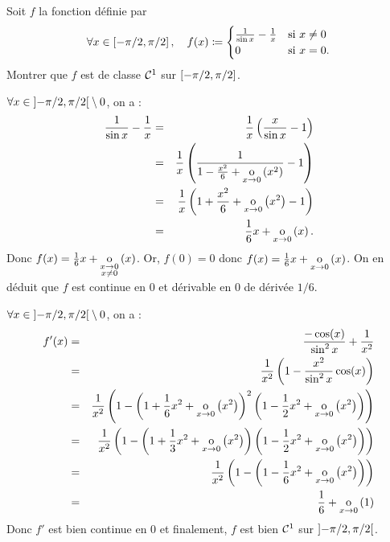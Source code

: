 \documentclass{magnolia}
\begin{document}
Soit $f$ la fonction définie par
\[\forall x\in\left[-\pi/2,\pi/2\right] ,\quad f(x)\coloneqq
  \begin{cases}
  \frac{1}{\sin x}-\frac{1}{x} & \text{si $x\neq 0$}\\
  0 & \text{si $x=0$.}
  \end{cases}\]
Montrer que $f$ est de classe $\mathcal{C}^{1}$ sur $\left[-\pi/2,\pi/2\right]$.

\begin{sol}
$\forall x \in \left]-\pi/2,\pi/2\right[\setminus{0}$, on a :
\begin{eqnarray*}
\frac{1}{\sin x}-\frac{1}{x}&=&\frac{1}{x}\left(\frac{x}{\sin x}-1\right)\\
&=&\frac{1}{x}\left(\frac{1}{1-\frac{x^2}{6}+\underset{x \rightarrow 0}{\text{o}}\left(x^2\right)}-1\right)\\
&=&\frac{1}{x}\left(1+\frac{x^2}{6}+\underset{x \rightarrow 0}{\text{o}}\left(x^2\right)-1\right)\\
&=&\frac{1}{6}x+\underset{x \rightarrow 0}{\text{o}}\left(x\right).
\end{eqnarray*}
Donc $f(x)=\frac{1}{6}x+\underset{\substack{x \rightarrow 0\\x\neq 0}}{\text{o}} \left(x\right)$. Or, $f(0)=0$ donc $f(x)=\frac{1}{6}x+\underset{x \rightarrow 0}{\text{o}}\left(x\right)$. On en déduit que $f$ est continue en $0$ et dérivable en $0$ de dérivée $1/6$.

$\forall x \in \left]-\pi/2,\pi/2\right[\setminus{0}$, on a :
\begin{eqnarray*}
f'(x)&=&\frac{-\cos(x)}{\sin^2 x}+\frac{1}{x^2}\\
&=&\frac{1}{x^2}\left(1-\frac{x^2}{\sin^2 x}\cos(x)\right)\\
&=&\frac{1}{x^2}\left(1-\left(1+\frac{1}{6}x^2+\underset{x \rightarrow 0}{\text{o}}\left(x^2\right)\right)^2\left(1-\frac{1}{2}x^2+\underset{x \rightarrow 0}{\text{o}}\left(x^2\right)\right)\right)\\
&=&\frac{1}{x^2}\left(1-\left(1+\frac{1}{3}x^2+\underset{x \rightarrow 0}{\text{o}}\left(x^2\right)\right)\left(1-\frac{1}{2}x^2+\underset{x \rightarrow 0}{\text{o}}\left(x^2\right)\right)\right)\\
&=&\frac{1}{x^2}\left(1-\left(1-\frac{1}{6}x^2+\underset{x \rightarrow 0}{\text{o}}\left(x^2\right)\right)\right)\\
&=&\frac{1}{6}+\underset{x \rightarrow 0}{\text{o}}\left(1\right)
\end{eqnarray*}
Donc $f'$ est bien continue en $0$ et finalement, $f$ est bien $\mathcal{C}^{1}$ sur $\left]-\pi/2,\pi/2\right[$.

\end{sol}

\end{document}
